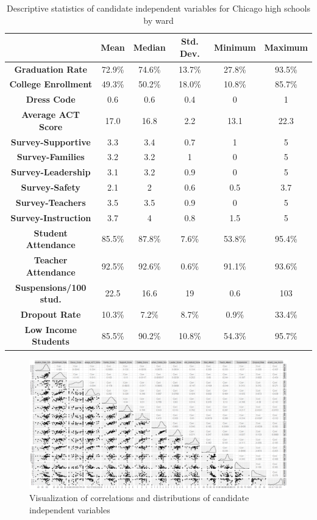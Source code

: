 \documentclass[12pt]{article}
\begin{document}
\begin{center}
	\begin{table}[h]
		\begin{tabular}{ c | c | c | c | c | c }
			
			& \textbf{Mean} & \textbf{Median} & \textbf{Std. Dev.} & \textbf{Minimum} & \textbf{Maximum} \\ 
			\hline
			\textbf{Graduation Rate} & 72.9\% & 74.6\% & 13.7\% & 27.8\% & 93.5\% \\
			\textbf{College Enrollment} & 49.3\% & 50.2\% & 18.0\% & 10.8\% & 85.7\% \\
			\textbf{Dress Code} & 0.6 & 0.6 & 0.4 & 0 & 1\\
			\textbf{Average ACT Score} & 17.0 & 16.8 & 2.2 & 13.1 & 22.3\\
			\textbf{Survey-Supportive} & 3.3 & 3.4 & 0.7 & 1 & 5\\
			\textbf{Survey-Families} & 3.2 & 3.2 & 1 & 0 & 5\\
			\textbf{Survey-Leadership} & 3.1 & 3.2 & 0.9 & 0 & 5\\
			\textbf{Survey-Safety} & 2.1 & 2 & 0.6 & 0.5 & 3.7\\
			\textbf{Survey-Teachers} & 3.5 & 3.5 & 0.9 & 0 & 5\\
			\textbf{Survey-Instruction} & 3.7 & 4 & 0.8 & 1.5 & 5\\
			\textbf{Student Attendance} & 85.5\% & 87.8\% & 7.6\% & 53.8\% & 95.4\% \\
			\textbf{Teacher Attendance} & 92.5\% & 92.6\% & 0.6\% & 91.1\% & 93.6\% \\
			\textbf{Suspensions/100 stud.} & 22.5 & 16.6 & 19 & 0.6 & 103\\
			\textbf{Dropout Rate} & 10.3\% & 7.2\% & 8.7\% & 0.9\% & 33.4\% \\
			\textbf{Low Income Students} & 85.5\% & 90.2\% & 10.8\% & 54.3\% & 95.7\% 
			
		\end{tabular}
		\caption{Descriptive statistics of candidate independent variables for Chicago high schools by ward}
	\end{table}
\end{center}

	\begin{figure}[h]
		\includegraphics[scale=.33]{pairplot.png}
		\caption{Visualization of correlations and distributions of candidate independent variables}
	\end{figure}
\end{document}
